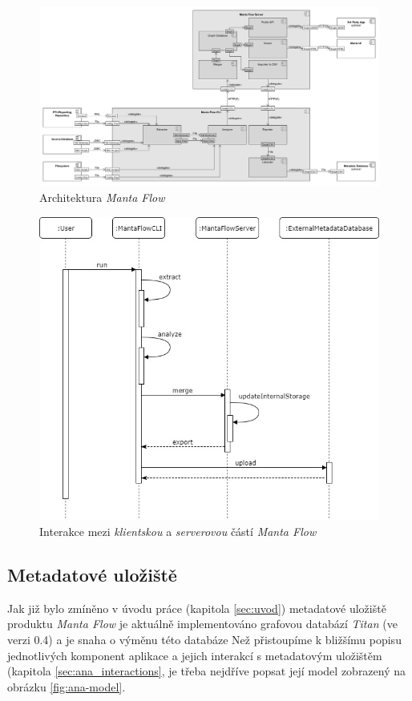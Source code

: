 \begin{figure}
\begin{center}
\includegraphics[width=14cm]{figures/flow_comp}
\caption{Architektura \textit{Manta Flow}}
\label{fig:ana-flow-comp}
\end{center}
\end{figure}

\begin{figure}
\begin{center}
\includegraphics[width=14cm]{figures/flow_seq}
\caption{Interakce mezi \textit{klientskou} a \textit{serverovou} částí \textit{Manta Flow}}
\label{fig:ana-flow-seq}
\end{center}
\end{figure}

\subsection{Metadatové uložiště}
Jak již bylo zmíněno v úvodu práce (kapitola \ref{sec:uvod}) metadatové uložiště produktu \textit{Manta Flow} je aktuálně implementováno grafovou databází \textit{Titan} (ve verzi 0.4) a je snaha o výměnu této databáze %
Než přistoupíme k bližšímu popisu jednotlivých komponent aplikace a jejich interakcí s metadatovým uložištěm (kapitola \ref{sec:ana_interactions}, je třeba nejdříve popsat její model zobrazený na obrázku \ref{fig:ana-model}.  

